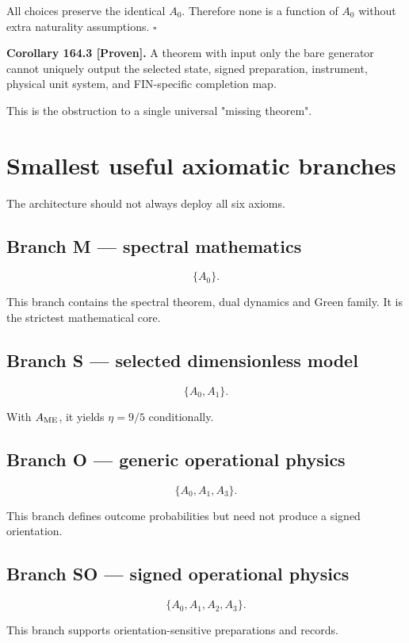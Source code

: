 \documentclass[11pt,a4paper,openany]{report}
\newcommand{\statusProven}{\textcolor{fingreen}{[Proven]}}
\begin{document}
All choices preserve the identical \(A_0\). Therefore none is a function of \(A_0\) without extra naturality assumptions. \(\square\)

\textbf{Corollary 164.3 \statusProven{}.} A theorem with input only the bare generator cannot uniquely output the selected state, signed preparation, instrument, physical unit system, and FIN-specific completion map.

This is the obstruction to a single universal "missing theorem".

\section{Smallest useful axiomatic branches}

The architecture should not always deploy all six axioms.

\subsection{Branch M --- spectral mathematics}

\[
\{A_0\}.
\]

This branch contains the spectral theorem, dual dynamics and Green family. It is the strictest mathematical core.

\subsection{Branch S --- selected dimensionless model}

\[
\{A_0,A_1\}.
\]

With \(A_{\rm ME}\), it yields \(\eta=9/5\) conditionally.

\subsection{Branch O --- generic operational physics}

\[
\{A_0,A_1,A_3\}.
\]

This branch defines outcome probabilities but need not produce a signed orientation.

\subsection{Branch SO --- signed operational physics}

\[
\{A_0,A_1,A_2,A_3\}.
\]

This branch supports orientation-sensitive preparations and records.
\end{document}
